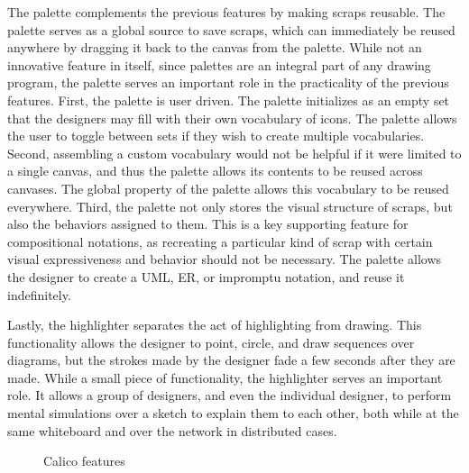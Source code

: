 The palette complements the previous features by making scraps reusable. The palette serves as a global source to save scraps, which can immediately be reused anywhere by dragging it back to the canvas from the palette. While not an innovative feature in itself, since palettes are an integral part of any drawing program, the palette serves an important role in the practicality of the previous features. First, the palette is user driven. The palette initializes as an empty set that the designers may fill with their own vocabulary of icons. The palette allows the user to toggle between sets if they wish to create multiple vocabularies. Second, assembling a custom vocabulary would not be helpful if it were limited to a single canvas, and thus the palette allows its contents to be reused across canvases. The global property of the palette allows this vocabulary to be reused everywhere. Third, the palette not only stores the visual structure of scraps, but also the behaviors assigned to them. This is a key supporting feature for compositional notations, as recreating a particular kind of scrap with certain visual expressiveness and behavior should not be necessary. The palette allows the designer to create a UML, ER, or impromptu notation, and reuse it indefinitely.

Lastly, the highlighter separates the act of highlighting from drawing. This functionality allows the designer to point, circle, and draw sequences over diagrams, but the strokes made by the designer fade a few seconds after they are made. While a small piece of functionality, the highlighter serves an important role. It allows a group of designers, and even the individual designer, to perform mental simulations over a sketch to explain them to each other, both while at the same whiteboard and over the network in distributed cases.

\begin{figure}%
  \centering
   \caption {Calico features}
   \label{fig:calico-version-two:overview}
\end{figure}%

